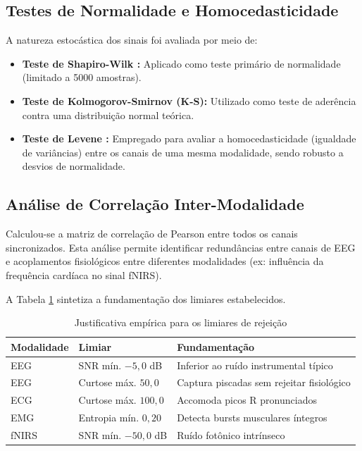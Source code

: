 \subsection{Testes de Normalidade e Homocedasticidade}
A natureza estocástica dos sinais foi avaliada por meio de:
\begin{itemize}
    \item \textbf{Teste de Shapiro-Wilk \cite{shapiro1965analysis}:} Aplicado como teste primário de normalidade (limitado a 5000 amostras).
    \item \textbf{Teste de Kolmogorov-Smirnov (K-S):} Utilizado como teste de aderência contra uma distribuição normal teórica.
    \item \textbf{Teste de Levene \cite{levene1960contributions}:} Empregado para avaliar a homocedasticidade (igualdade de variâncias) entre os canais de uma mesma modalidade, sendo robusto a desvios de normalidade.
\end{itemize}

\subsection{Análise de Correlação Inter-Modalidade}
Calculou-se a matriz de correlação de Pearson entre todos os canais sincronizados. Esta análise permite identificar redundâncias entre canais de EEG e acoplamentos fisiológicos entre diferentes modalidades (ex: influência da frequência cardíaca no sinal fNIRS).

A Tabela \ref{tab:sqi_threshold_justification} sintetiza a fundamentação dos 
limiares estabelecidos.

\begin{table}[htbp]
    \centering
    \caption{Justificativa empírica para os limiares de rejeição}
    \label{tab:sqi_threshold_justification}
    \begin{tabular}{p{2.5cm}p{3cm}p{3.5cm}}
        \toprule
        \textbf{Modalidade} & \textbf{Limiar} & \textbf{Fundamentação} \\
        \midrule
        EEG & SNR mín. $-5{,}0$ dB & Inferior ao ruído instrumental típico \\
        EEG & Curtose máx. $50{,}0$ & Captura piscadas sem rejeitar fisiológico \\
        ECG & Curtose máx. $100{,}0$ & Accomoda picos R pronunciados \\
        EMG & Entropia mín. $0{,}20$ & Detecta bursts musculares íntegros \\
        fNIRS & SNR mín. $-50{,}0$ dB & Ruído fotônico intrínseco \\
        \bottomrule
    \end{tabular}
\end{table}

